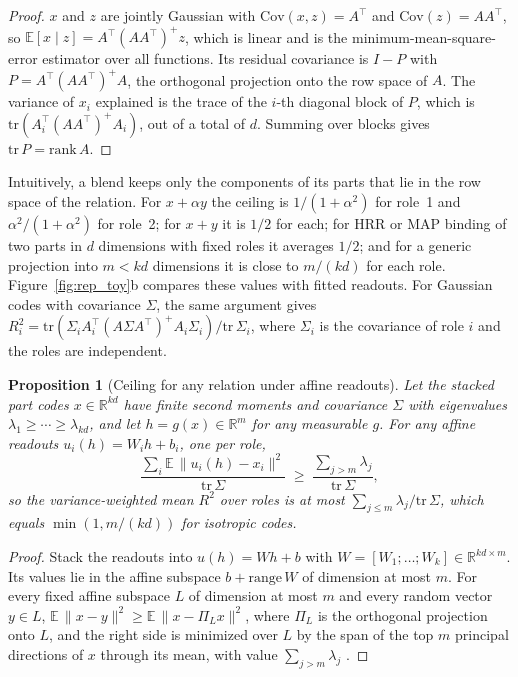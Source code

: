 \documentclass[10pt]{article}
\theoremstyle{plain}
\newtheorem{proposition}{Proposition}
\theoremstyle{remark}
\newcommand{\R}{\mathbb{R}}
\begin{document}
\begin{proof}
$x$ and $z$ are jointly Gaussian with $\mathrm{Cov}(x, z) = A^{\top}$ and $\mathrm{Cov}(z) = AA^{\top}$, so $\mathbb{E}[x \mid z] = A^{\top}(AA^{\top})^{+}z$, which is linear and is the minimum-mean-square-error estimator over all functions. Its residual covariance is $I - P$ with $P = A^{\top}(AA^{\top})^{+}A$, the orthogonal projection onto the row space of $A$. The variance of $x_i$ explained is the trace of the $i$-th diagonal block of $P$, which is $\mathrm{tr}(A_i^{\top}(AA^{\top})^{+}A_i)$, out of a total of $d$. Summing over blocks gives $\mathrm{tr}\,P = \mathrm{rank}\,A$.
\end{proof}

\noindent
Intuitively, a blend keeps only the components of its parts that lie in the row space of the relation. For $x + \alpha y$ the ceiling is $1/(1 + \alpha^2)$ for role~1 and $\alpha^2/(1 + \alpha^2)$ for role~2; for $x + y$ it is $1/2$ for each; for HRR or MAP binding of two parts in $d$ dimensions with fixed roles it averages $1/2$; and for a generic projection into $m < kd$ dimensions it is close to $m/(kd)$ for each role. Figure~\ref{fig:rep_toy}b compares these values with fitted readouts. For Gaussian codes with covariance $\Sigma$, the same argument gives $R^2_i = \mathrm{tr}(\Sigma_i A_i^{\top}(A\Sigma A^{\top})^{+}A_i\Sigma_i)/\mathrm{tr}\,\Sigma_i$, where $\Sigma_i$ is the covariance of role $i$ and the roles are independent.

\begin{proposition}[Ceiling for any relation under affine readouts]
\label{prop:ey}
Let the stacked part codes $x \in \R^{kd}$ have finite second moments and covariance $\Sigma$ with eigenvalues $\lambda_1 \ge \cdots \ge \lambda_{kd}$, and let $h = g(x) \in \R^m$ for any measurable $g$. For any affine readouts $u_i(h) = W_i h + b_i$, one per role,
\begin{equation}
  \frac{\sum_i \mathbb{E}\,\lVert u_i(h) - x_i \rVert^2}{\mathrm{tr}\,\Sigma} \;\ge\; \frac{\sum_{j > m} \lambda_j}{\mathrm{tr}\,\Sigma},
\end{equation}
so the variance-weighted mean $R^2$ over roles is at most $\sum_{j \le m} \lambda_j / \mathrm{tr}\,\Sigma$, which equals $\min(1, m/(kd))$ for isotropic codes.
\end{proposition}

\begin{proof}
Stack the readouts into $u(h) = Wh + b$ with $W = [W_1; \ldots; W_k] \in \R^{kd \times m}$. Its values lie in the affine subspace $b + \mathrm{range}\,W$ of dimension at most $m$. For every fixed affine subspace $L$ of dimension at most $m$ and every random vector $y \in L$, $\mathbb{E}\,\lVert x - y \rVert^2 \ge \mathbb{E}\,\lVert x - \Pi_L x \rVert^2$, where $\Pi_L$ is the orthogonal projection onto $L$, and the right side is minimized over $L$ by the span of the top $m$ principal directions of $x$ through its mean, with value $\sum_{j > m} \lambda_j$ \citep{eckart1936}.
\end{proof}
\end{document}

